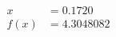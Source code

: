 \documentclass[preview]{standalone}
\begin{document}
\begin{align*}
x &= 0.1720\\f(x) &= 4.3048082
\end{align*}
\end{document}

